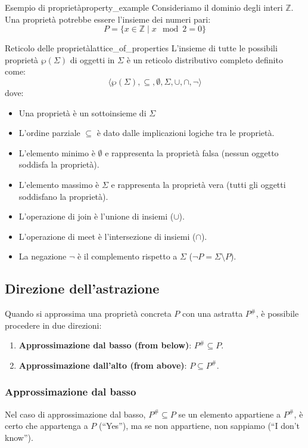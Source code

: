 \begin{esempio}{Esempio di proprietà}{property_example}
Consideriamo il dominio degli interi $\mathbb{Z}$. Una proprietà potrebbe essere
l'insieme dei numeri pari:
\[
P = \{ x \in \mathbb{Z} \mid x \mod 2 = 0 \}
\]
\end{esempio}


\begin{definizione}{Reticolo delle proprietà}{lattice_of_properties}
L'insieme di tutte le possibili proprietà $\wp(\Sigma)$ di oggetti in $\Sigma$
è un reticolo distributivo completo definito come:
\[
\langle \wp(\Sigma), \subseteq, \emptyset, \Sigma, \cup, \cap, \neg \rangle
\]
dove:
\begin{itemize}
    \item Una proprietà è un sottoinsieme di $\Sigma$
    \item L'ordine parziale $\subseteq$ è dato dalle implicazioni logiche tra
    le proprietà.
    \item L'elemento minimo è $\emptyset$ e rappresenta la proprietà falsa
    (nessun oggetto soddisfa la proprietà).
    \item L'elemento massimo è $\Sigma$ e rappresenta la proprietà vera
    (tutti gli oggetti soddisfano la proprietà).
    \item L'operazione di join è l'unione di insiemi ($\cup$).
    \item L'operazione di meet è l'intersezione di insiemi ($\cap$).
    \item La negazione $\neg$ è il complemento rispetto a $\Sigma$
    ($\neg P = \Sigma \setminus P$).
\end{itemize}
\end{definizione}

\subsection{Direzione dell'astrazione}

Quando si approssima una proprietà concreta $P$ con una astratta $P^{\#}$,
è possibile procedere in due direzioni:
\begin{enumerate}
    \item \textbf{Approssimazione dal basso (from below)}: $P^{\#} \subseteq P$.
    \item \textbf{Approssimazione dall'alto (from above)}: $P \subseteq P^{\#}$.
\end{enumerate}


\subsubsection{Approssimazione dal basso}
Nel caso di approssimazione dal basso, $P^{\#} \subseteq P$ se un elemento
appartiene a $P^{\#}$, è certo che appartenga a $P$ (``Yes''), ma se non
appartiene, non sappiamo (``I don't know'').

